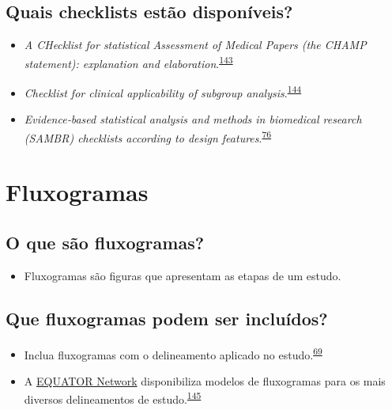 \documentclass[
]{book}
\providecommand{\tightlist}{%
  \setlength{\itemsep}{0pt}\setlength{\parskip}{0pt}}
\begin{document}
\hypertarget{quais-checklists-estuxe3o-disponuxedveis}{%
\subsection{Quais checklists estão disponíveis?}\label{quais-checklists-estuxe3o-disponuxedveis}}

\begin{itemize}
\item
  \emph{A CHecklist for statistical Assessment of Medical Papers (the CHAMP statement): explanation and elaboration}.\textsuperscript{\protect\hyperlink{ref-Mansournia2021}{143}}
\item
  \emph{Checklist for clinical applicability of subgroup analysis}.\textsuperscript{\protect\hyperlink{ref-Gil-Sierra2020}{144}}
\item
  \emph{Evidence‐based statistical analysis and methods in biomedical research (SAMBR) checklists according to design features}.\textsuperscript{\protect\hyperlink{ref-dwivedi2019}{76}}
\end{itemize}

\hypertarget{fluxogramas}{%
\section{Fluxogramas}\label{fluxogramas}}

\hypertarget{o-que-suxe3o-fluxogramas}{%
\subsection{O que são fluxogramas?}\label{o-que-suxe3o-fluxogramas}}

\begin{itemize}
\tightlist
\item
  Fluxogramas são figuras que apresentam as etapas de um estudo.
\end{itemize}

\hypertarget{que-fluxogramas-podem-ser-incluuxeddos}{%
\subsection{Que fluxogramas podem ser incluídos?}\label{que-fluxogramas-podem-ser-incluuxeddos}}

\begin{itemize}
\item
  Inclua fluxogramas com o delineamento aplicado no estudo.\textsuperscript{\protect\hyperlink{ref-Weissgerber2019}{69}}
\item
  A \href{https://www.equator-network.org}{EQUATOR Network} disponibiliza modelos de fluxogramas para os mais diversos delineamentos de estudo.\textsuperscript{\protect\hyperlink{ref-Altman2008}{145}}
\end{itemize}
\end{document}
